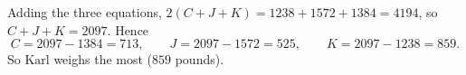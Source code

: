 Adding the three equations, $2(C+J+K)=1238+1572+1384=4194$, so $C+J+K=2097$. Hence
\[C=2097-1384=713,\qquad J=2097-1572=525,\qquad K=2097-1238=859 .\]
So $\boxed{\text{Karl}}$ weighs the most ($859$ pounds).
